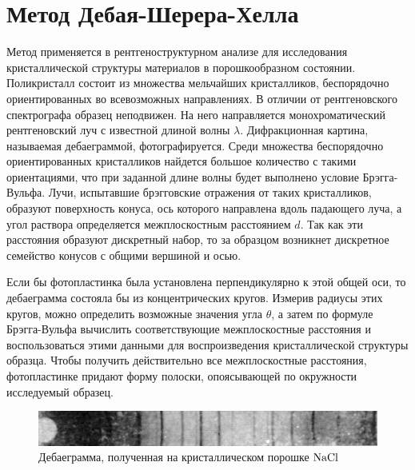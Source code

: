 \documentclass[12pt]{kiarticle} %
\begin{document}
\section{Метод Дебая-Шерера-Хелла}
Метод применяется в рентгеноструктурном анализе для исследования кристаллической структуры материалов в порошкообразном состоянии. Поликристалл состоит из множества мельчайших кристалликов, беспорядочно ориентированных во всевозможных направлениях. В отличии от рентгеновского спектрографа образец неподвижен. На него направляется монохроматический рентгеновский луч с известной длиной волны $\lambda$. Дифракционная картина, называемая дебаеграммой, фотографируется.
Среди множества беспорядочно ориентированных кристалликов найдется большое количество с такими ориентациями, что при заданной длине волны будет выполнено условие Брэгга-Вульфа. Лучи, испытавшие брэгговские отражения от таких кристалликов, образуют поверхность конуса, ось которого направлена вдоль падающего луча, а угол раствора определяется межплоскостным расстоянием $d$. Так как эти расстояния образуют дискретный набор, то за образцом возникнет дискретное семейство конусов с общими вершиной и осью.

Если бы фотопластинка была установлена перпендикулярно к этой общей оси, то дебаеграмма состояла бы из концентрических кругов. Измерив радиусы этих кругов, можно определить возможные значения угла $\theta$, а затем по формуле Брэгга-Вульфа вычислить соответствующие межплоскостные расстояния и воспользоваться этими данными для воспроизведения кристаллической структуры образца.
Чтобы получить действительно все межплоскостные расстояния, фотопластинке придают форму полоски, опоясывающей по окружности исследуемый образец.

\begin{figure}[H]
	\begin{center}
		\includegraphics[width=0.8\linewidth]{pic6.png}
		\caption{Дебаеграмма, полученная на кристаллическом порошке $\rm NaCl$} 
	\end{center}
\end{figure}
\vspace{-30pt}
\end{document}
